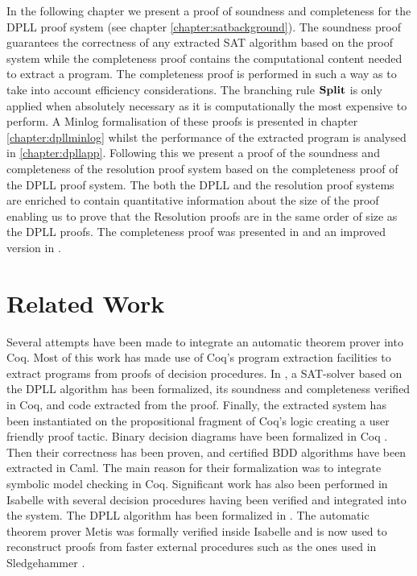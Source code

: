  \label{chapter:dpll}
In the following chapter we present a proof of soundness and completeness for the DPLL proof system (see chapter \ref{chapter:satbackground}). The soundness proof guarantees the correctness of any extracted SAT algorithm based on the proof system while the completeness proof contains the computational content needed to extract a program. The completeness proof is performed in such a way as to take into account efficiency considerations. The branching rule $\mathbf{Split}$ is only applied when absolutely necessary as it is computationally the most expensive to perform. A Minlog formalisation of these proofs is presented in chapter \ref{chapter:dpllminlog} whilst the performance of the extracted program is analysed in \ref{chapter:dpllapp}. Following this we present a proof of the soundness and completeness of the resolution proof system based on the completeness proof of the DPLL proof system. The both the DPLL and the resolution proof systems are enriched to contain quantitative information about the size of the proof enabling us to prove that the Resolution proofs are in the same order of size as the DPLL proofs. The completeness proof was presented in \cite{AL12} and an improved version in \cite{AL14b}.

\section{Related Work}
Several attempts have been made to integrate an automatic theorem prover into Coq. Most of this work has made use of Coq's program extraction facilities to extract programs from proofs of decision procedures.
 In \cite{SL08}, a SAT-solver based on the DPLL algorithm has been
formalized, its soundness and completeness verified in Coq,
and code extracted from the proof.
Finally, the extracted system has been instantiated on the propositional fragment of Coq's logic creating a user friendly proof tactic.  Binary decision diagrams have been formalized in Coq \cite{KV00}. Then their correctness has been proven, and certified BDD algorithms have been extracted in Caml. The main reason for their formalization was to integrate symbolic model checking in Coq.
%
Significant work has also been performed in Isabelle with several decision procedures having been verified and integrated into the system. The DPLL algorithm has been formalized in \cite{FM10}. The automatic theorem prover Metis \cite{LP07} was formally verified inside Isabelle and is now used to reconstruct proofs from faster external procedures such as the ones used in Sledgehammer \cite{SB10}.

